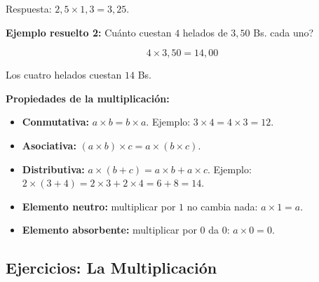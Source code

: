 \documentclass[12pt, letterpaper]{article}
\begin{document}
\noindent Respuesta: $2{,}5 \times 1{,}3 = 3{,}25$.

\noindent\textbf{Ejemplo resuelto 2:} \textquestiondown Cuánto cuestan $4$ helados de $3{,}50$ Bs. cada uno?

\[
  4 \times 3{,}50 = 14{,}00
\]

\noindent Los cuatro helados cuestan $14$ Bs.

\begin{cuadroadvertencia}
  \textbf{Propiedades de la multiplicación:}
  \begin{itemize}
    \item \textbf{Conmutativa:} $a \times b = b \times a$. Ejemplo: $3 \times 4 = 4 \times 3 = 12$.
    \item \textbf{Asociativa:} $(a \times b) \times c = a \times (b \times c)$.
    \item \textbf{Distributiva:} $a \times (b + c) = a \times b + a \times c$. Ejemplo: $2 \times (3 + 4) = 2 \times 3 + 2 \times 4 = 6 + 8 = 14$.
    \item \textbf{Elemento neutro:} multiplicar por $1$ no cambia nada: $a \times 1 = a$.
    \item \textbf{Elemento absorbente:} multiplicar por $0$ da $0$: $a \times 0 = 0$.
  \end{itemize}
\end{cuadroadvertencia}

\subsection{Ejercicios: La Multiplicación}
\end{document}
